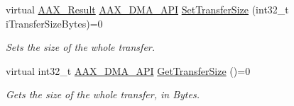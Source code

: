 \begin{Indent}
\begin{DoxyCompactItemize}
virtual \mbox{\hyperlink{a00392_a4d8f69a697df7f70c3a8e9b8ee130d2f}{A\+A\+X\+\_\+\+Result}} \mbox{\hyperlink{a00587_acae60d01e5e4bd3282369d0d9d378f3f}{A\+A\+X\+\_\+\+D\+M\+A\+\_\+\+A\+PI}} \mbox{\hyperlink{a01809_a4d38f5502dc2446ea997e675d3f59d61}{Set\+Transfer\+Size}} (int32\+\_\+t i\+Transfer\+Size\+Bytes)=0
\begin{DoxyCompactList}\small\item\em Sets the size of the whole transfer. \end{DoxyCompactList}\item 
virtual int32\+\_\+t \mbox{\hyperlink{a00587_acae60d01e5e4bd3282369d0d9d378f3f}{A\+A\+X\+\_\+\+D\+M\+A\+\_\+\+A\+PI}} \mbox{\hyperlink{a01809_a3cd20d341b8b592d259716768a03a88a}{Get\+Transfer\+Size}} ()=0
\begin{DoxyCompactList}\small\item\em Gets the size of the whole transfer, in Bytes. \end{DoxyCompactList}\end{DoxyCompactItemize}
\end{Indent}
